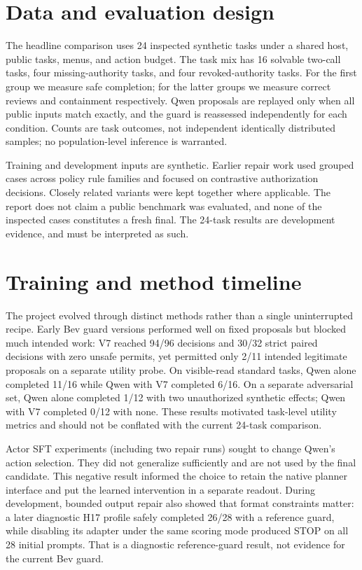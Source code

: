 \documentclass[11pt]{article}
\begin{document}
\section{Data and evaluation design}
The headline comparison uses 24 inspected synthetic tasks under a shared host, public tasks, menus, and action budget. The task mix has 16 solvable two-call tasks, four missing-authority tasks, and four revoked-authority tasks. For the first group we measure safe completion; for the latter groups we measure correct reviews and containment respectively. Qwen proposals are replayed only when all public inputs match exactly, and the guard is reassessed independently for each condition. Counts are task outcomes, not independent identically distributed samples; no population-level inference is warranted.

Training and development inputs are synthetic. Earlier repair work used grouped cases across policy rule families and focused on contrastive authorization decisions. Closely related variants were kept together where applicable. The report does not claim a public benchmark was evaluated, and none of the inspected cases constitutes a fresh final. The 24-task results are development evidence, and must be interpreted as such.

\section{Training and method timeline}
The project evolved through distinct methods rather than a single uninterrupted recipe. Early Bev guard versions performed well on fixed proposals but blocked much intended work: V7 reached 94/96 decisions and 30/32 strict paired decisions with zero unsafe permits, yet permitted only 2/11 intended legitimate proposals on a separate utility probe. On visible-read standard tasks, Qwen alone completed 11/16 while Qwen with V7 completed 6/16. On a separate adversarial set, Qwen alone completed 1/12 with two unauthorized synthetic effects; Qwen with V7 completed 0/12 with none. These results motivated task-level utility metrics and should not be conflated with the current 24-task comparison.

Actor SFT experiments (including two repair runs) sought to change Qwen's action selection. They did not generalize sufficiently and are not used by the final candidate. This negative result informed the choice to retain the native planner interface and put the learned intervention in a separate readout. During development, bounded output repair also showed that format constraints matter: a later diagnostic H17 profile safely completed 26/28 with a reference guard, while disabling its adapter under the same scoring mode produced STOP on all 28 initial prompts. That is a diagnostic reference-guard result, not evidence for the current Bev guard.
\end{document}
